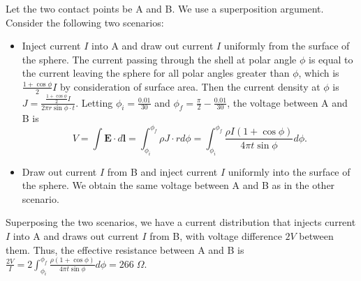 \begin{solution}

Let the two contact points be A and B. We use a superposition argument. Consider the following two scenarios:
\begin{itemize}
    \item Inject current $I$ into A and draw out current $I$ uniformly from the surface of the sphere. The current passing through the shell at polar angle $\phi$ is equal to the current leaving the sphere for all polar angles greater than $\phi$, which is $\frac{1+\cos\phi}{2}I$ by consideration of surface area. Then the current density at $\phi$ is $J=\frac{\frac{1+\cos\phi}{2}I}{2\pi r\sin\phi\cdot t}$. Letting $\phi_i=\frac{0.01}{30}$ and $\phi_f=\frac{\pi}{2}-\frac{0.01}{30}$, the voltage between A and B is $$V=\int \mathbf{E}\cdot d\mathbf{l}=\int_{\phi_i}^{\phi_f}\rho J\cdot rd\phi=\int_{\phi_i}^{\phi_f}\frac{\rho I(1+\cos\phi)}{4\pi t\sin\phi}d\phi.$$
    \item Draw out current $I$ from B and inject current $I$ uniformly into the surface of the sphere. We obtain the same voltage between A and B as in the other scenario.
\end{itemize}
Superposing the two scenarios, we have a current distribution that injects current $I$ into A and draws out current $I$ from B, with voltage difference $2V$ between them. Thus, the effective resistance between A and B is $\frac{2V}{I}=2\int_{\phi_i}^{\phi_f}\frac{\rho (1+\cos\phi)}{4\pi t\sin\phi}d\phi=\boxed{266\;\Omega}$.

\end{solution}